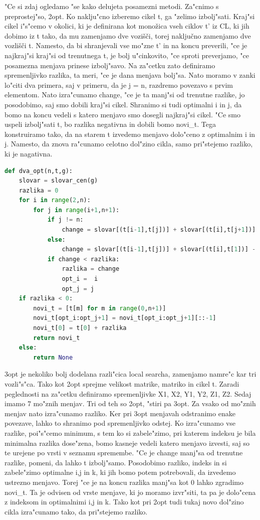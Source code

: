 \documentclass[12pt,a4paper]{amsart}
\theoremstyle{definition} %
\theoremstyle{plain} %
\begin{document}
"Ce si zdaj ogledamo "se kako delujeta posamezni metodi. Za"cnimo s preprostej"so, 2opt. 
Ko naklju"cno izberemo cikel t, ga "zelimo izbolj"sati. Kraj"si cikel i"s"cemo v okolici, ki je definirana kot monožica vseh ciklov t' iz CL, 
ki jih dobimo iz t tako, da mu zamenjamo dve vozišči, torej naključno zamenjamo dve vozlišči t. Namesto, da bi shranjevali vse mo"zne  t' in na koncu preverili, "ce je najkraj"si kraj"si od trenutnega t, je bolj u"cinkovito, "ce sproti preverjamo, "ce posamezna menjava prinese izbolj"savo. Na za"cetku zato definiramo spremenljivko razlika, ta meri, "ce je dana menjava bolj"sa. Nato moramo v zanki lo"citi dva primera, saj v primeru, da je j = n, razdremo povezavo s prvim elementom. Nato izra"cunamo change, "ce je ta manj"si od trenutne razlike, jo posodobimo, saj smo dobili kraj"si cikel. Shranimo si tudi optimalni i in j, da bomo na koncu vedeli s katero menjavo smo dosegli najkraj"si cikel. "Ce smo uspeli izbolj"sati t, bo razlika negativna in dobili bomo novi\_t. Tega konstruiramo tako, da na starem t izvedemo menjavo dolo"ceno z optimalnim i in j. Namesto, da znova ra"cunamo celotno dol"zino cikla, samo pri"stejemo razliko, ki je nagativna. 

\begin{lstlisting}[language=Python]
def dva_opt(n,t,g):
    slovar = slovar_cen(g)
    razlika = 0
    for i in range(2,n):
        for j in range(i+1,n+1):
            if j != n:
                change = slovar[(t[i-1],t[j])] + slovar[(t[i],t[j+1])] - slovar[(t[i-1],t[i])] - slovar[(t[j],t[j+1])]
            else:
                change = slovar[(t[i-1],t[j])] + slovar[(t[i],t[1])] - slovar[(t[i-1],t[i])] - slovar[(t[j],t[1])]               
            if change < razlika:
                razlika = change
                opt_i =  i
                opt_j = j
    if razlika < 0:
        novi_t = [t[m] for m in range(0,n+1)]
        novi_t[opt_i:opt_j+1] = novi_t[opt_i:opt_j+1][::-1]
        novi_t[0] = t[0] + razlika        
        return novi_t
    else:
        return None
\end{lstlisting}

3opt je nekoliko bolj dodelana razli"cica local searcha, zamenjamo namre"c kar tri vozli"s"ca. Tako kot 2opt sprejme velikost matrike, 
matriko in cikel t. Zaradi peglednosti na za"cetku definiramo spremenljivke X1, X2, Y1, Y2, Z1, Z2. Sedaj imamo 7 mo"znih menjav. Tri od teh so 2opt, "stiri pa 3opt. Za vsako od mo"znih menjav nato izra"cunamo razliko. Ker pri 3opt menjavah odstranimo enake povezave, lahko to shranimo pod spremenljivko odstej. Ko izra"cunamo vse razlike, poi"s"cemo minimum, s tem ko si zabele"zimo, pri katerem indeksu je bila minimalna razlika dose"zena, bomo kasneje vedeli katero menjavo izvesti, saj so te urejene po vrsti v seznamu spremembe. "Ce je change manj"sa od trenutne razlike, pomeni, da lahko t izbolj"samo. Posodobimo razliko, indeks in si zabele"zimo optimalne i,j in k, ki jih bomo potem potrebovali, da izvedemo ustrezno menjavo. Torej "ce je na koncu razlika manj"sa kot 0 lahko zgradimo novi\_t. Ta je odvisen od vrste menjave, ki jo moramo izvr"siti, ta pa je dolo"cena z indeksom in optimalnimi i,j in k. Tako kot pri 2opt tudi tukaj novo dol"zino cikla izra"cunamo tako, da pri"stejemo razliko. 
\end{document}
